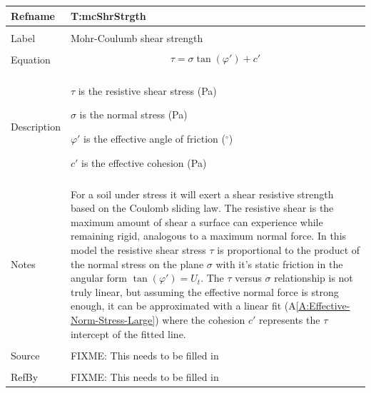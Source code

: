 \documentclass[12pt]{article}
\begin{document}
\noindent \begin{minipage}{\textwidth}
\begin{tabular}{p{} p{}}
\toprule \textbf{Refname} & \textbf{T:mcShrStrgth}
\label{T:mcShrStrgth}
\\ \midrule \\
Label & Mohr-Coulumb shear strength
\\ \midrule \\
Equation & \begin{dmath}
           τ=σ \tan\left(φ'\right)+c'
           \end{dmath}
\\ \midrule \\
Description & \begin{symbDescription}
              \item{$τ$ is the resistive shear stress (Pa)}
              \item{$σ$ is the normal stress (Pa)}
              \item{$φ'$ is the effective angle of friction (${}^{\circ}$)}
              \item{$c'$ is the effective cohesion (Pa)}
              \end{symbDescription}
\\ \midrule \\
Notes & For a soil under stress it will exert a shear resistive strength based on the Coulomb sliding law. The resistive shear is the maximum amount of shear a surface can experience while remaining rigid, analogous to a maximum normal force. In this model the resistive shear stress $τ$ is proportional to the product of the normal stress on the plane $σ$ with it's static friction in the angular form $\tan\left(φ'\right)={U_{t}}$. The $τ$ versus $σ$ relationship is not truly linear, but assuming the effective normal force is strong enough, it can be approximated with a linear fit (A\ref{A:Effective-Norm-Stress-Large}) where the cohesion $c'$ represents the $τ$ intercept of the fitted line.
\\ \midrule \\
Source & FIXME: This needs to be filled in
\\ \midrule \\
RefBy & FIXME: This needs to be filled in
\\ \bottomrule \end{tabular}
\end{minipage}\\
~\newline
\end{document}
